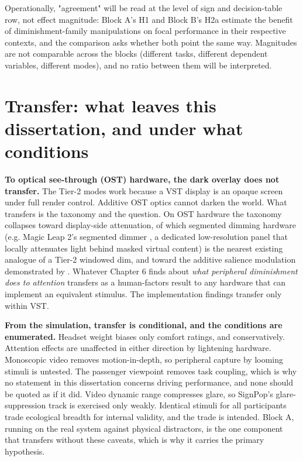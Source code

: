 Operationally, "agreement" will be read at the level of sign and decision-table row, not effect
magnitude: Block A's H1 and Block B's H2a estimate the benefit of diminishment-family manipulations
on focal performance in their respective contexts, and the comparison asks whether both point the
same way. Magnitudes are not comparable across the blocks (different tasks, different dependent
variables, different modes), and no ratio between them will be interpreted.

\section{Transfer: what leaves this dissertation, and under what conditions}

\textbf{To optical see-through (OST) hardware, the dark overlay does not transfer.} The Tier-2 modes
work because a VST display is an opaque screen under full render control. Additive OST optics
cannot darken the world. What transfers is the taxonomy and the question. On OST hardware the
taxonomy collapses toward display-side attenuation, of which segmented dimming hardware (e.g.
Magic Leap 2's segmented dimmer \citep{magic2024}, a dedicated low-resolution panel that locally attenuates light behind masked virtual content) is the nearest existing analogue of a
Tier-2 windowed dim, and toward the additive salience modulation demonstrated by \citet{sutton2022}. Whatever Chapter 6 finds about \textit{what peripheral diminishment does to attention} transfers
as a human-factors result to any hardware that can implement an equivalent stimulus. The
implementation findings transfer only within VST.

\textbf{From the simulation, transfer is conditional, and the conditions are enumerated.} Headset weight
biases only comfort ratings, and conservatively. Attention effects are unaffected in either
direction by lightening hardware. Monoscopic video removes motion-in-depth, so peripheral capture
by looming stimuli is untested. The passenger viewpoint removes task coupling, which is why no
statement in this dissertation concerns driving performance, and none should be quoted as if it
did. Video dynamic range compresses glare, so SignPop's glare-suppression track is exercised only
weakly. Identical stimuli for all participants trade ecological breadth for internal validity, and
the trade is intended. Block A, running on the real system against physical distractors, is the one
component that transfers without these caveats, which is why it carries the primary hypothesis.

